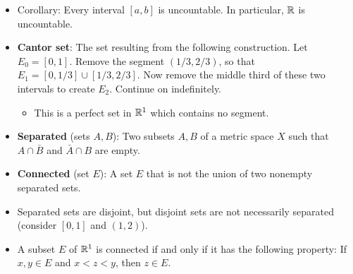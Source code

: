 \documentclass[../../notes.tex]{subfiles}
\begin{document}
\begin{itemize}
\begin{proof}
        Now suppose for the sake of contradiction that $P$ is countable, and denote the elements of $P$ by $\x_1,\x_2,\dots$. We now construct a sequence $\{V_n\}$ of neighborhoods, as follows. Let $V_1=N_r(\x_1)$. Clearly, $V_1\subset P$ since $\x_1\in P$. It follows that since $V_1$ is a neighborhood that $V_1$ contains infinitely many points of $P$. Now suppose inductively that $V_n$ has been constructed. Thus, by analogous conditions to those on $V_1$, we may let $V_{n+1}$ be a neighborhood such that (i) $\bar{V}_{n+1}\subset V_n$, (ii) $\x_n\notin\bar{V}_{n+1}$, and (iii) $V_{n+1}\cap P$ is nonempty. By (iii), we can continue on to construct $V_{n+2}$, and so on and so forth.\par
        Let $K_n=\bar{V}_n\cap P$. Since $\bar{V}_n$ is closed and bounded, $\bar{V}_n$ is compact. Additionally, since $\x_n\notin K_{n+1}$ for each $n$, no point of $P$ lies in $\bigcap_1^\infty K_n$. Thus, since each $K_n\subset P$, $\bigcap_1^\infty K_n$ is empty. But this contradicts our previous result that since each $K_n$ is nonempty, compact, and such that $K_n\supset K_{n+1}$, $\bigcap_1^\infty K_n$ is nonempty.
    \end{proof}
    \item Corollary: Every interval $[a,b]$ is uncountable. In particular, $\mathbb{R}$ is uncountable.
    \item \textbf{Cantor set}: The set resulting from the following construction. Let $E_0=[0,1]$. Remove the segment $(1/3,2/3)$, so that $E_1=[0,1/3]\cup[1/3,2/3]$. Now remove the middle third of these two intervals to create $E_2$. Continue on indefinitely.
    \begin{itemize}
        \item This is a perfect set in $\mathbb{R}^1$ which contains no segment.
    \end{itemize}
    \item \textbf{Separated} (sets $A,B$): Two subsets $A,B$ of a metric space $X$ such that $A\cap\bar{B}$ and $\bar{A}\cap B$ are empty.
    \item \textbf{Connected} (set $E$): A set $E$ that is not the union of two nonempty separated sets.
    \item Separated sets are disjoint, but disjoint sets are not necessarily separated (consider $[0,1]$ and $(1,2)$).
    \item A subset $E$ of $\mathbb{R}^1$ is connected if and only if it has the following property: If $x,y\in E$ and $x<z<y$, then $z\in E$.
\end{itemize}
\end{document}
